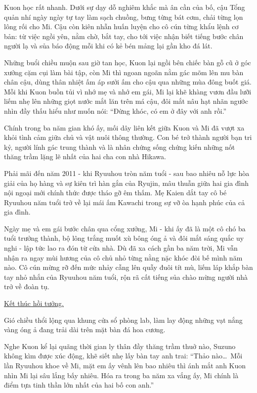 \documentclass[../main.tex]{subfiles}
\begin{document}
Kuon học rất nhanh. Dưới sự dạy dỗ nghiêm khắc mà ân cần của bố, cậu Tổng quản nhí ngày ngày tự tay làm sạch chuồng, bưng từng bát cơm, chải từng lọn lông rối cho Mi. Cậu còn kiên nhẫn huấn luyện cho cô cún từng khẩu lệnh cơ bản: từ việc ngồi yên, nằm chờ, bắt tay, cho tới việc nhận biết tiếng bước chân người lạ và sủa báo động mỗi khi có kẻ bén mảng lại gần kho đá lát.

Những buổi chiều muộn sau giờ tan học, Kuon lại ngồi bên chiếc bàn gỗ cũ ở góc xưởng cặm cụi làm bài tập, còn Mi thì ngoan ngoãn nằm gác mõm lên mu bàn chân cậu, dùng thân nhiệt ấm áp sưởi ấm cho cậu qua những mùa đông buốt giá. Mỗi khi Kuon buồn tủi vì nhớ mẹ và nhớ em gái, Mi lại khẽ khàng vươn đầu lưỡi liếm nhẹ lên những giọt nước mắt lăn trên má cậu, đôi mắt nâu hạt nhãn ngước nhìn đầy thấu hiểu như muốn nói: ``Đừng khóc, có em ở đây với anh rồi.''

Chính trong ba năm gian khó ấy, mối dây liên kết giữa Kuon và Mi đã vượt xa khỏi tình cảm giữa chủ và vật nuôi thông thường. Con bé trở thành người bạn tri kỷ, người lính gác trung thành và là nhân chứng sống chứng kiến những nốt thăng trầm lặng lẽ nhất của hai cha con nhà Hikawa.

Phải mãi đến năm 2011 - khi Ryuuhou tròn năm tuổi - sau bao nhiêu nỗ lực hòa giải của họ hàng và sự kiên trì hàn gắn của Ryujin, mâu thuẫn giữa hai gia đình nội ngoại mới chính thức được tháo gỡ êm thấm. Mẹ Kaien dắt tay cô bé Ryuuhou năm tuổi trở về lại mái ấm Kawachi trong sự vỡ òa hạnh phúc của cả gia đình.

Ngày mẹ và em gái bước chân qua cổng xưởng, Mi - khi ấy đã là một cô chó ba tuổi trưởng thành, bộ lông trắng muốt xù bông óng ả và đôi mắt sáng quắc uy nghi - lập tức lao ra đón từ cửa nhà. Dù đã xa cách gần ba năm trời, Mi vẫn nhận ra ngay mùi hương của cô chủ nhỏ từng nằng nặc khóc đòi bế mình năm nào. Cô cún mừng rỡ đến mức nhảy cẫng lên quẫy đuôi tít mù, liếm láp khắp bàn tay nhỏ nhắn của Ryuuhou năm tuổi, rộn rã cất tiếng sủa chào mừng người nhà trở về đoàn tụ.

\begin{center}
    \uline{Kết thúc hồi tưởng.}
\end{center}

Gió chiều thổi lộng qua khung cửa sổ phòng lab, làm lay động những vạt nắng vàng óng ả đang trải dài trên mặt bàn đá hoa cương.

Nghe Kuon kể lại quãng thời gian ly thân đầy thăng trầm thuở nào, Suzuno không kìm được xúc động, khẽ siết nhẹ lấy bàn tay anh trai: ``Thảo nào\dots\ Mỗi lần Ryuuhou khoe về Mi, mặt em ấy vênh lên bao nhiêu thì ánh mắt anh Kuon nhìn Mi lại sâu lắng bấy nhiêu. Hóa ra trong ba năm xa vắng ấy, Mi chính là điểm tựa tinh thần lớn nhất của hai bố con anh.''
\end{document}
